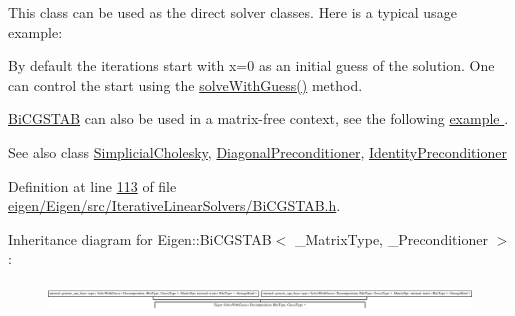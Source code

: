 This class can be used as the direct solver classes. Here is a typical usage example\+: 
\begin{DoxyCodeInclude}
\end{DoxyCodeInclude}


By default the iterations start with x=0 as an initial guess of the solution. One can control the start using the \hyperlink{group___iterative_linear_solvers___module_adcc18d1ab283786dcbb5a3f63f4b4bd8}{solve\+With\+Guess()} method.

\hyperlink{group___iterative_linear_solvers___module_class_eigen_1_1_bi_c_g_s_t_a_b}{Bi\+C\+G\+S\+T\+AB} can also be used in a matrix-\/free context, see the following \hyperlink{group___matrixfree_solver_example}{example }.

\begin{DoxySeeAlso}{See also}
class \hyperlink{group___sparse_cholesky___module_class_eigen_1_1_simplicial_cholesky}{Simplicial\+Cholesky}, \hyperlink{group___iterative_linear_solvers___module_class_eigen_1_1_diagonal_preconditioner}{Diagonal\+Preconditioner}, \hyperlink{group___iterative_linear_solvers___module_class_eigen_1_1_identity_preconditioner}{Identity\+Preconditioner} 
\end{DoxySeeAlso}


Definition at line \hyperlink{eigen_2_eigen_2src_2_iterative_linear_solvers_2_bi_c_g_s_t_a_b_8h_source_l00113}{113} of file \hyperlink{eigen_2_eigen_2src_2_iterative_linear_solvers_2_bi_c_g_s_t_a_b_8h_source}{eigen/\+Eigen/src/\+Iterative\+Linear\+Solvers/\+Bi\+C\+G\+S\+T\+A\+B.\+h}.

Inheritance diagram for Eigen\+:\+:Bi\+C\+G\+S\+T\+AB$<$ \+\_\+\+Matrix\+Type, \+\_\+\+Preconditioner $>$\+:\begin{figure}[H]
\begin{center}
\leavevmode
\includegraphics[height=0.784753cm]{group___iterative_linear_solvers___module}
\end{center}
\end{figure}
